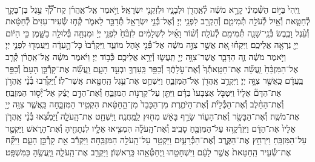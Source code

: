 \documentclass[twoside, openany, parskip=half, 11pt]{book}
\begin{document}
\begin{footnotesize}
\begin{multicols}{2}
\\
וַֽיְהִי֙ בַּיּ֣וֹם הַשְּׁ֯מִינִ֔י קָרָ֣א מֹשֶׁ֔ה לְ֯אַֽהֲרֹ֖ן וּלְבָנָ֑יו וּלְזִקְנֵ֖י יִשְׂרָאֵֽל׃ וַיֹּ֣אמֶר אֶֽל־אַֽהֲרֹ֗ן קַח־לְ֠֯ךָ֠ עֵ֣גֶל בֶּן־בָּקָ֧ר לְ֯חַטָּ֛את וְ֯אַ֥יִל לְ֯עֹלָ֖ה תְּ֯מִימִ֑ם וְ֯הַקְרֵ֖ב לִפְנֵ֥י יְיָ׃ וְ֯אֶל־בְּ֯נֵ֥י יִשְׂרָאֵ֖ל תְּ֯דַבֵּ֣ר לֵאמֹ֑ר קְ֯ח֤וּ שְׂ֯עִיר־עִזִּים֙ לְ֯חַטָּ֔את וְ֯עֵ֨גֶל וָכֶ֧בֶשׂ בְּ֯נֵֽי־שָׁנָ֛ה תְּ֯מִימִ֖ם לְ֯עֹלָֽה׃ וְ֯שׁ֨וֹר וָאַ֜יִל לִשְׁלָמִ֗ים לִזְבֹּ֨חַ֙ לִפְנֵ֣י יְיָ֔ וּמִנְחָ֖ה בְּ֯לוּלָ֣ה בַשָּׁ֑מֶן כִּ֣י הַיּ֔וֹם יְיָ֖ נִרְאָ֥ה אֲלֵיכֶֽם׃ וַיִּקְח֗וּ אֵ֚ת אֲשֶׁ֣ר צִוָּ֣ה מֹשֶׁ֔ה אֶל־פְּ֯נֵ֖י אֹ֣הֶל מוֹעֵ֑ד וַֽיִּקְרְ֯בוּ֙ כׇּל־הָ֣עֵדָ֔ה וַיַּֽעַמְד֖וּ לִפְנֵ֥י יְיָ׃ וַיֹּ֣אמֶר מֹשֶׁ֔ה זֶ֧ה הַדָּבָ֛ר אֲשֶׁר־צִוָּ֥ה יְיָ֖ תַּֽעֲשׂ֑וּ וְ֯יֵרָ֥א אֲלֵיכֶ֖ם כְּ֯ב֥וֹד יְיָ׃  וַיֹּ֨אמֶר מֹשֶׁ֜ה אֶֽל־אַֽהֲרֹ֗ן קְ֯רַ֤ב אֶל־הַמִּזְבֵּ֨חַ֙ וַֽעֲשֵׂ֞ה אֶת־חַטָּֽאתְ֯ךָ֙ וְ֯אֶת־עֹ֣לָתֶ֔ךָ וְ֯כַפֵּ֥ר בַּֽעַדְךָ֖ וּבְעַ֣ד הָעָ֑ם וַֽעֲשֵׂ֞ה אֶת־קָרְ֯בַּ֤ן הָעָם֙ וְ֯כַפֵּ֣ר בַּֽעֲדָ֔ם כַּֽאֲשֶׁ֖ר צִוָּ֥ה יְיָ׃ וַיִּקְרַ֥ב אַֽהֲרֹ֖ן אֶל־הַמִּזְבֵּ֑חַ וַיִּשְׁחַ֛ט אֶת־עֵ֥גֶל הַֽחַטָּ֖את אֲשֶׁר־לֽוֹ׃ וַ֠יַּקְרִ֠בוּ בְּ֯נֵ֨י אַֽהֲרֹ֣ן אֶת־הַדָּם֘ אֵלָיו֒ וַיִּטְבֹּ֤ל אֶצְבָּעוֹ֙ בַּדָּ֔ם וַיִּתֵּ֖ן עַל־קַרְנ֣וֹת הַמִּזְבֵּ֑חַ וְ֯אֶת־הַדָּ֣ם יָצַ֔ק אֶל־יְ֯ס֖וֹד הַמִּזְבֵּֽחַ׃ וְ֯אֶת־הַחֵ֨לֶב וְ֯אֶת־הַכְּ֯לָיֹ֜ת וְ֯אֶת־הַיֹּתֶ֤רֶת מִן־הַכָּבֵד֙ מִן־הַ֣חַטָּ֔את הִקְטִ֖יר הַמִּזְבֵּ֑חָה כַּֽאֲשֶׁ֛ר צִוָּ֥ה יְיָ֖ אֶת־מֹשֶֽׁה׃  וְ֯אֶת־הַבָּשָׂ֖ר וְ֯אֶת־הָע֑וֹר שָׂרַ֣ף בָּאֵ֔שׁ מִח֖וּץ לַֽמַּֽחֲנֶֽה׃ וַיִּשְׁחַ֖ט אֶת־הָֽעֹלָ֑ה וַ֠יַּמְצִ֠אוּ בְּ֯נֵ֨י אַֽהֲרֹ֤ן אֵלָיו֙ אֶת־הַדָּ֔ם וַיִּזְרְ֯קֵ֥הוּ עַל־הַמִּזְבֵּ֖חַ סָבִֽיב׃ וְ֯אֶת־הָֽעֹלָ֗ה הִמְצִ֧יאוּ אֵלָ֛יו לִנְתָחֶ֖יהָ וְ֯אֶת־הָרֹ֑אשׁ וַיַּקְטֵ֖ר עַל־הַמִּזְבֵּֽחַ׃ וַיִּרְחַ֥ץ אֶת־הַקֶּ֖רֶב וְ֯אֶת־הַכְּ֯רָעָ֑יִם וַיַּקְטֵ֥ר עַל־הָֽעֹלָ֖ה הַמִּזְבֵּֽחָה׃ וַיַּקְרֵ֕ב אֵ֖ת קָרְ֯בַּ֣ן הָעָ֑ם וַיִּקַּ֞ח אֶת־שְׂ֯עִ֤יר הַֽחַטָּאת֙ אֲשֶׁ֣ר לָעָ֔ם וַיִּשְׁחָטֵ֥הוּ וַֽיְחַטְּ֯אֵ֖הוּ כָּֽרִאשֽׁוֹן׃ וַיַּקְרֵ֖ב אֶת־הָֽעֹלָ֑ה וַֽיַּֽעֲשֶׂ֖הָ כַּמִּשְׁפָּֽט׃


\end{multicols}
\end{footnotesize}
\end{document}
